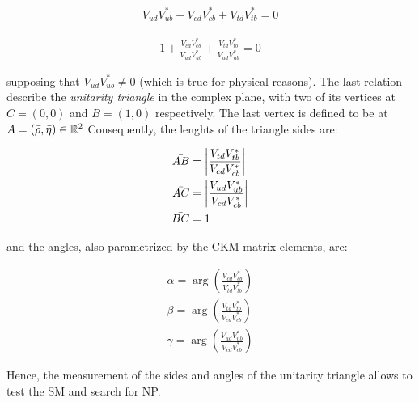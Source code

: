 \begin{align}
    V_{ud}V_{ub}^* + V_{cd}V_{cb}^* + V_{td}V_{tb}^* = 0
\end{align}

\begin{align}
    1 + \frac{V_{cd}V_{cb}^*}{V_{ud}V_{ub}^*} + \frac{V_{td}V_{tb}^*}{V_{ud}V_{ub}^*} = 0
\end{align}

supposing that $V_{ud}V_{ub}^* \neq 0$ (which is true for physical reasons).
The last relation describe the \textit{unitarity triangle} in the complex plane, with two of its vertices at $C = (0, 0)$ and $B = (1, 0)$ respectively.
The last vertex is defined to be at $A = (\Bar{\rho}, \Bar{\eta}) \in \mathbb{R}^2$
Consequently, the lenghts of the triangle sides are:

\begin{align}
    \Bar{AB} &= \abs{\frac{V_{td}V_{tb}^*}{V_{cd}V_{cb}^*}} \\
    \Bar{AC} &= \abs{\frac{V_{ud}V_{ub}^*}{V_{cd}V_{cb}^*}} \\
    \Bar{BC} &= 1
\end{align}

and the angles, also parametrized by the \gls{CKM} matrix elements, are:

\begin{align}
    \alpha = \arg\left(\frac{V_{cd}V_{cb}^*}{V_{td}V_{tb}^*}\right) \\
    \beta =  \arg\left(\frac{V_{td}V_{tb}^*}{V_{cd}V_{cb}^*}\right) \\
    \gamma = \arg\left(\frac{V_{ud}V_{ub}^*}{V_{cd}V_{cb}^*}\right)
\end{align}

Hence, the measurement of the sides and angles of the unitarity triangle allows to test the \gls{SM} and search for \gls{NP}.
